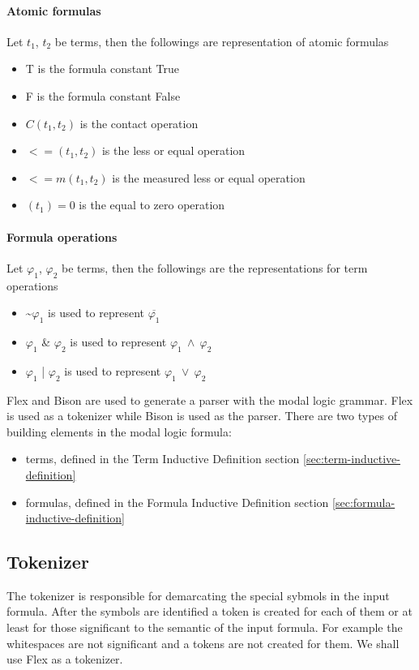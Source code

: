 \documentclass{article}
\begin{document}
		\paragraph{Atomic formulas}
		Let $t_1$, $t_2$ be terms, then the followings are representation of atomic formulas
		\begin{itemize}
			\item T is the formula constant True
			\item F is the formula constant False
			\item $C(t_1, t_2)$ is the contact operation
			\item $<=(t_1, t_2)$ is the less or equal operation
			\item $<=m(t_1, t_2)$ is the measured less or equal operation
			\item $(t_1)=0$ is the equal to zero operation
		\end{itemize}

		\paragraph{Formula operations}
		Let $\varphi_1$, $\varphi_2$ be terms, then the followings are the representations for term operations
		\begin{itemize}
			\item \textasciitilde $\varphi_1$ is used to represent $\overline{\varphi_1}$
			\item $\varphi_1$ \& $\varphi_2$ is used to represent $\varphi_1 \: \wedge \: \varphi_2$
			\item $\varphi_1$ | $\varphi_2$ is used to represent $\varphi_1 \: \vee \: \varphi_2$
		\end{itemize}

		Flex and Bison are used to generate a parser with the modal logic grammar.
		Flex is used as a tokenizer while Bison is used as the parser.
		\newline
		There are two types of building elements in the modal logic formula:
		\begin{itemize}
			\item terms, defined in the Term Inductive Definition section \ref{sec:term-inductive-definition}
			\item formulas, defined in the Formula Inductive Definition section \ref{sec:formula-inductive-definition}
		\end{itemize}

	\subsection{Tokenizer}
		The tokenizer is responsible for demarcating the special sybmols in the input formula.
		After the symbols are identified a token is created for each of them or at least for those significant to the semantic of the input formula.
		For example the whitespaces are not significant and a tokens are not created for them.
		We shall use Flex as a tokenizer.
\end{document}
